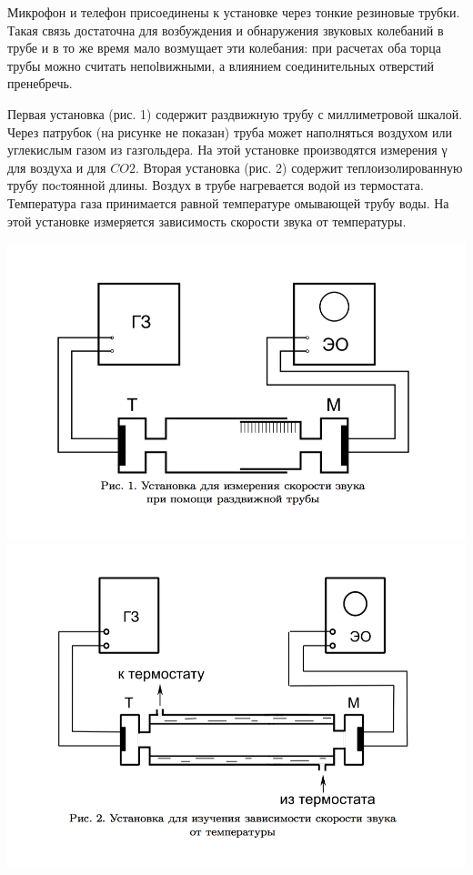 \documentclass[12pt]{article}
\begin{document}
Микрофон и телефон присоединены к установке через тонкие резиновые трубки. Такая связь достаточна для возбуждения и обнаружения звуковых колебаний в трубе и в то же время мало возмущает эти колебания: при расчетах оба торца трубы можно считать непоlвижными, а влиянием соединительных отверстий пренебречь.

Первая установка (рис. 1) содержит раздвижную трубу с миллиметровой шкалой. Через патрубок (на рисунке не показан) труба может наполняться воздухом или углекислым газом из газгольдера. На этой установке производятся измерения γ для воздуха и для $CO2$. Вторая установка (рис. 2) содержит теплоизолированную трубу поcтоянной длины. Воздух в трубе нагревается водой из термостата. Температура газа принимается равной температуре омывающей трубу воды. На этой установке измеряется зависимость скорости звука от температуры.

\includegraphics[scale = 0.46]{gr1} \\
\includegraphics[scale = 0.46]{gr2}
\end{document}
